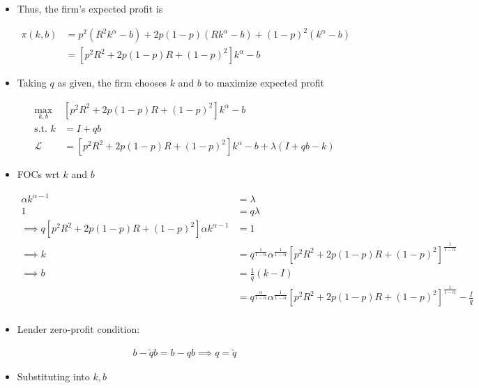 \documentclass{article}
\newcommand{\Lfn}{\mathcal{L}}
\begin{document}
\begin{itemize}
\item Thus, the firm's expected profit is

\begin{align*}
\pi(k,b) 
&= p^2 (R^2 k^\alpha - b) + 2p(1-p) (R k^\alpha - b) + (1-p)^2 (k^\alpha - b)\\
&= [p^2 R^2 + 2p(1-p) R  + (1-p)^2] k^\alpha - b
\end{align*}

\item Taking $q$ as given, the firm chooses $k$ and $b$ to maximize expected profit

\begin{align*}
\max_{k,b} & [p^2 R^2 + 2p(1-p) R  + (1-p)^2] k^\alpha - b\\
\text{s.t. } k &= I + qb\\
\Lfn &= [p^2 R^2 + 2p(1-p) R  + (1-p)^2] k^\alpha - b + \lambda(I + qb - k)
\end{align*}

\item FOCs wrt $k$ and $b$

\begin{align*}
[p^2 R^2 + 2p(1-p) R  + (1-p)^2] \alpha k^{\alpha-1}  &= \lambda\\
1  &= q \lambda\\
\implies
q[p^2 R^2 + 2p(1-p) R  + (1-p)^2] \alpha k^{\alpha-1} &= 1 \\
\implies
k 
&= q^{\frac{1}{1-\alpha}} \alpha^{\frac{1}{1-\alpha}}[p^2 R^2 + 2p(1-p) R  + (1-p)^2]^{\frac{1}{1-\alpha}}\\
\implies
b 
&= \frac{1}{q}(k - I)\\
&= q^{\frac{\alpha}{1-\alpha}} \alpha^{\frac{1}{1-\alpha}}[p^2 R^2 + 2p(1-p) R  + (1-p)^2]^{\frac{1}{1-\alpha}} - \frac{I}{q}\\
\end{align*}

\item Lender zero-profit condition:

\begin{align*}
b - \tilde q b = b - q b \implies q = \tilde q
\end{align*}

\item Substituting into $k,b$


\end{itemize}
\end{document}
